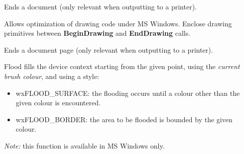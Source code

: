 \begin{comment}
\membersection{wxDC::EnableCache}\label{wxdcenablecache}

\func{static void}{EnableCache}{\param{bool}{ enableCache}}

On supported platforms (currently only Windows), enables the DC cache
which can speed up the \helpref{Blit}{wxdcblit} operation when
drawing a large number of masked bitmaps.

If using the cache functions in your code, please test for the
wxUSE\_DC\_CACHEING preprocessor symbol for portability.

\wxheading{See also}

\helpref{wxDC::CacheEnabled}{wxdccacheenabled}, \helpref{wxDC::ClearCache}
\end{comment}

\label{wxdcenddoc}


Ends a document (only relevant when outputting to a printer).

\label{wxdcenddrawing}


Allows optimization of drawing code under MS Windows. Enclose
drawing primitives between {\bf BeginDrawing} and {\bf EndDrawing}\rtfsp
calls.

\label{wxdcendpage}


Ends a document page (only relevant when outputting to a printer).

\label{wxdcfloodfill}


Flood fills the device context starting from the given point, using
the {\it current brush colour}, and using a style:

\begin{itemize}\itemsep=0pt
\item wxFLOOD\_SURFACE: the flooding occurs until a colour other than the given colour is encountered.
\item wxFLOOD\_BORDER: the area to be flooded is bounded by the given colour.
\end{itemize}

{\it Note:} this function is available in MS Windows only.


